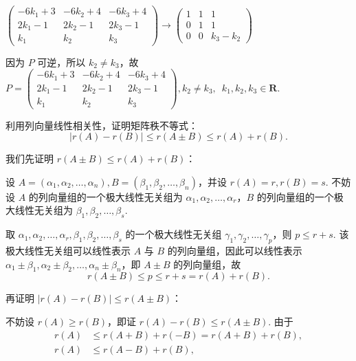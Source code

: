 \begin{exercise}
\begin{exgroup}
\begin{answer}
\begin{enumerate}
                        $\begin{pmatrix}-6k_1+3 & -6k_2+4 & -6k_3+4 \\ 2k_1-1 & 2k_2-1 & 2k_3-1 \\ k_1 & k_2 & k_3\end{pmatrix}\rightarrow \begin{pmatrix}1 & 1 & 1 \\ 0 & 1 & 1 \\ 0 & 0 & k_3-k_2\end{pmatrix}$

                        因为 $P$ 可逆，所以 $k_2\neq k_3$，故 $P=\begin{pmatrix}-6k_1+3 & -6k_2+4 & -6k_3+4 \\ 2k_1-1 & 2k_2-1 & 2k_3-1 \\ k_1 & k_2 & k_3\end{pmatrix},k_2\neq k_3,\enspace k_1,k_2,k_3 \in \mathbf{R}$.
            \end{enumerate}
        \end{answer}

        \item 利用列向量线性相关性，证明矩阵秩不等式：\[|r(A)-r(B)|\leqslant r(A\pm B) \leqslant r(A)+r(B).\]
        \begin{answer}
            我们先证明 $r(A \pm B) \leqslant r(A)+r(B)$：

            设 $A = (\alpha_1, \alpha_2, \ldots, \alpha_n), B = (\beta_1, \beta_2, \ldots, \beta_n)$，并设 $r(A) = r, r(B) = s$. 不妨设 $A$ 的列向量组的一个极大线性无关组为 $\alpha_1, \alpha_2, \ldots, \alpha_r$，$B$ 的列向量组的一个极大线性无关组为 $\beta_1, \beta_2, \ldots, \beta_s$.

            取 $\alpha_1, \alpha_2, \ldots, \alpha_r, \beta_1, \beta_2, \ldots, \beta_s$ 的一个极大线性无关组 $\gamma_1, \gamma_2, \ldots, \gamma_p$，则 $p \leqslant r+s$. 该极大线性无关组可以线性表示 $A$ 与 $B$ 的列向量组，因此可以线性表示 $\alpha_1 \pm \beta_1, \alpha_2 \pm \beta_2, \ldots, \alpha_n \pm \beta_n$，即 $A \pm B$ 的列向量组，故
            \[
                r(A \pm B) \leqslant p \leqslant r+s = r(A) + r(B).
            \]

            再证明 $|r(A) - r(B)| \leqslant r(A \pm B)$：

            不妨设 $r(A) \geqslant r(B)$，即证 $r(A) - r(B) \leqslant r(A \pm B)$. 由于
            \begin{align*}
                r(A) &\leqslant r(A + B) + r(-B) = r(A + B) + r(B), \\
                r(A) &\leqslant r(A - B) + r(B),
            \end{align*}


\end{answer}
\end{exgroup}
\end{exercise}
